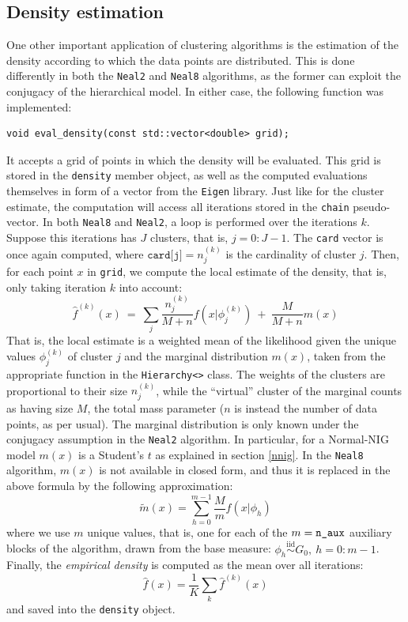 \subsection{Density estimation}
One other important application of clustering algorithms is the estimation of the density according to which the data points are distributed.
This is done differently in both the \verb|Neal2| and \verb|Neal8| algorithms, as the former can exploit the conjugacy of the hierarchical model.
In either case, the following function was implemented:
\begin{verbatim}
void eval_density(const std::vector<double> grid);
\end{verbatim}
It accepts a grid of points in which the density will be evaluated.
This grid is stored in the \verb|density| member object, as well as the computed evaluations themselves in form of a vector from the \verb|Eigen| library.
Just like for the cluster estimate, the computation will access all iterations stored in the \verb|chain| pseudo-vector.
In both \verb|Neal8| and \verb|Neal2|, a loop is performed over the iterations $k$.
Suppose this iterations has $J$ clusters, that is, $j=0:J-1$.
The \verb|card| vector is once again computed, where $\texttt{card[j]} = n^{(k)}_j$ is the cardinality of cluster $j$.
Then, for each point $x$ in \verb|grid|, we compute the local estimate of the density, that is, only taking iteration $k$ into account:
$$
\hat f^{(k)}(x) \ = \ \sum_j \frac{n^{(k)}_j}{M+n} f\left(x | \phi^{(k)}_j\right) \ + \ \frac{M}{M+n} m(x)
$$
That is, the local estimate is a weighted mean of the likelihood given the unique values $\phi^{(k)}_j$ of cluster $j$ and the marginal distribution $m(x)$, taken from the appropriate function in the \verb|Hierarchy<>| class.
The weights of the clusters are proportional to their size $n^{(k)}_j$, while the ``virtual'' cluster of the marginal counts as having size $M$, the total mass parameter ($n$ is instead the number of data points, as per usual).
The marginal distribution is only known under the conjugacy assumption in the \verb|Neal2| algorithm.
In particular, for a Normal-NIG model $m(x)$ is a Student's $t$ as explained in section \ref{nnig}.
In the \verb|Neal8| algorithm, $m(x)$ is not available in closed form, and thus it is replaced in the above formula by the following approximation:
$$
\tilde m(x) = \sum_{h=0}^{m-1} \frac{M}{m}  f\left(x | \phi_h\right)
$$ %
where we use $m$ unique values, that is, one for each of the $m = \verb|n_aux|$ auxiliary blocks of the algorithm, drawn from the base measure: $\phi_{h} \overset{\text{iid}}{\sim} G_0, \ h=0:m-1$. \\
Finally, the \emph{empirical density} is computed as the mean over all iterations:
$$
\hat f(x) = \frac{1}{K} \sum_k \hat f^{(k)}(x)
$$
and saved into the \verb|density| object.

